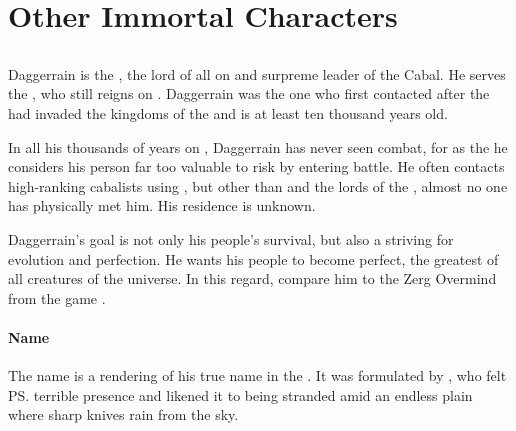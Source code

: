 
\part{Other Immortal Characters}























\chapter{\Banes}
\section{\Daggerrain}
\index{\Daggerrain}
Daggerrain is the \baneoverlord, the lord of all \banes{} on \Miith{} and surpreme leader of the Cabal. 
He serves the \baneking{} \Voidbringer, who still reigns on \Erebos. 
Daggerrain was the one who first contacted \Semiza{} after the \dragons{} had invaded the kingdoms of the \nephilim{} and is at least ten thousand years old. 

In all his thousands of years on \Miith{}, Daggerrain has never seen combat, for as the \baneoverlord{} he considers his person far too valuable to risk by entering battle. 
He often contacts high-ranking cabalists using , but other than \banelords{} and the lords of the \resphain, almost no one has physically met him. 
His residence is unknown.

Daggerrain's goal is not only his people's survival, but also a striving for evolution and perfection. 
He wants his people to become perfect, the greatest of all creatures of the universe. 
In this regard, compare him to the Zerg Overmind from the game \cite{VideoGame:Starcraft}.









\subsection{Name}
The name \Daggerrain{} is a rendering of his true name in the . 
It was formulated by \Semiza, who felt \ps{\Daggerrain}{} terrible presence and likened it to being stranded amid an endless plain where sharp knives rain from the sky.  

